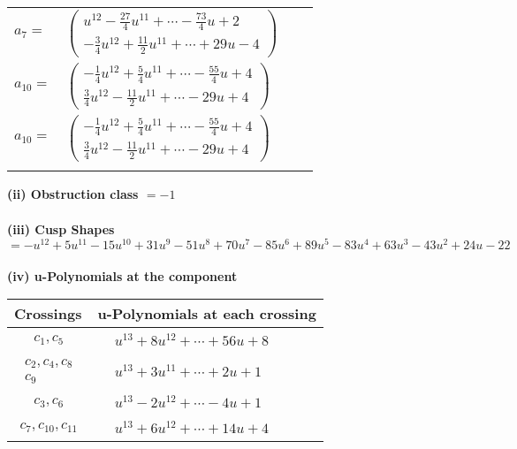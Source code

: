 \documentclass[1p]{elsarticle_modified}
\theoremstyle{definition}
\begin{document}
\begin{tabular}{m{7pt} m{180pt} m{7pt} m{180pt} }
\flushright $a_{7}=$&$\begin{pmatrix}u^{12}-\frac{27}{4} u^{11}+\cdots-\frac{73}{4} u+2\\-\frac{3}{4} u^{12}+\frac{11}{2} u^{11}+\cdots+29 u-4\end{pmatrix}$ \\
\flushright $a_{10}=$&$\begin{pmatrix}-\frac{1}{4} u^{12}+\frac{5}{4} u^{11}+\cdots-\frac{55}{4} u+4\\\frac{3}{4} u^{12}-\frac{11}{2} u^{11}+\cdots-29 u+4\end{pmatrix}$\\ \flushright $a_{10}=$&$\begin{pmatrix}-\frac{1}{4} u^{12}+\frac{5}{4} u^{11}+\cdots-\frac{55}{4} u+4\\\frac{3}{4} u^{12}-\frac{11}{2} u^{11}+\cdots-29 u+4\end{pmatrix}$\\&\end{tabular}
\flushleft \textbf{(ii) Obstruction class $= -1$}\\~\\
\flushleft \textbf{(iii) Cusp Shapes $= - u^{12}+5 u^{11}-15 u^{10}+31 u^9-51 u^8+70 u^7-85 u^6+89 u^5-83 u^4+63 u^3-43 u^2+24 u-22$}\\~\\
\newpage\renewcommand{\arraystretch}{1}
\flushleft \textbf{(iv) u-Polynomials at the component}\newline \\
\begin{tabular}{m{50pt}|m{274pt}}
Crossings & \hspace{64pt}u-Polynomials at each crossing \\
\hline $$\begin{aligned}c_{1},c_{5}\end{aligned}$$&$\begin{aligned}
&u^{13}+8 u^{12}+\cdots+56 u+8
\end{aligned}$\\
\hline $$\begin{aligned}c_{2},c_{4},c_{8}\\c_{9}\end{aligned}$$&$\begin{aligned}
&u^{13}+3 u^{11}+\cdots+2 u+1
\end{aligned}$\\
\hline $$\begin{aligned}c_{3},c_{6}\end{aligned}$$&$\begin{aligned}
&u^{13}-2 u^{12}+\cdots-4 u+1
\end{aligned}$\\
\hline $$\begin{aligned}c_{7},c_{10},c_{11}\end{aligned}$$&$\begin{aligned}
&u^{13}+6 u^{12}+\cdots+14 u+4
\end{aligned}$\\
\hline
\end{tabular}\\~\\
\end{document}
